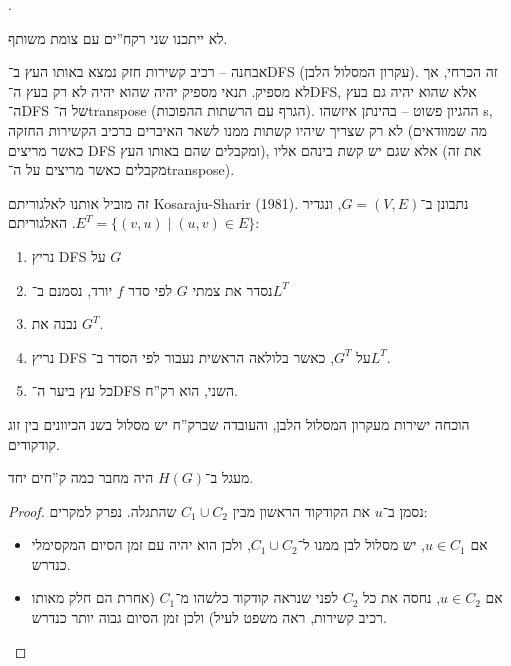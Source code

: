 \documentclass[]{../../../../tex/classes/styledArticle}
\begin{document}
	. 
	
	לא ייתכנו שני רקח''ים עם צומת משותף. 
	
	אבחנה – רכיב קשירות חזק נמצא באותו העץ ב־DFS (עקרון המסלול הלבן). זה הכרחי, אך לא מספיק. תנאי מספיק יהיה שהוא יהיה לא רק בעץ ה־DFS, אלא שהוא יהיה גם בעץ ה־DFS של ה־transpose (הגרף עם הרשתות ההפוכות). ההגיון פשוט – בהינתן איזשהו s, לא רק שצריך שיהיו קשתות ממנו לשאר האיברים ברכיב הקשירות החזקה (מה שמוודאים כאשר מריצים DFS ומקבלים שהם באותו העץ), אלא שגם יש קשת בינהם אליו (את זה מקבלים כאשר מריצים על ה־transpose). 
	
	זה מוביל אותנו לאלגוריתם Kosaraju-Sharir (1981). נתבונן ב־$G = (V, E)$, ונגדיר $E^{T} = \{(v, u) \mid (u, v) \in E\}$. האלגוריתם: 
	\begin{enumerate}
		\item נריץ DFS על $G$
		\item נסדר את צמתי $G$ לפי סדר $f$ יורד, נסמנם ב־$L^{T}$
		\item נבנה את $G^{T}$. 
		\item נריץ DFS על $G^{T}$, כאשר בלולאה הראשית נעבור לפי הסדר ב־$L^{T}$. 
		\item כל עץ ביער ה־DFS השני, הוא רק''ח. 
	\end{enumerate}
	
	הוכחה ישירות מעקרון המסלול הלבן, והעובדה שברק''ח יש מסלול בשנ הכיוונים בין זוג קודקודים. 
	
	מעגל ב־$H(G)$ היה מחבר כמה ק''חים יחד. 
	\begin{proof}
		נסמן ב־$u$ את הקודקוד הראשון מבין $C_1 \cup C_2$ שהתגלה. נפרק למקרים:
		\begin{itemize}
			\item אם $u \in C_1$, יש מסלול לבן ממנו ל־$C_1 \cup C_2$, ולכן הוא יהיה עם זמן הסיום המקסימלי כנדרש. 
			\item אם $u \in C_2$, נחסה את כל $C_2$ לפני שנראה קודקוד כלשהו מ־$C_1$ (אחרת הם חלק מאותו רכיב קשירות, ראה משפט לעיל) ולכן זמן הסיום גבוה יותר כנדרש. 
		\end{itemize}\envendproof
	\end{proof}
	
\end{document}
